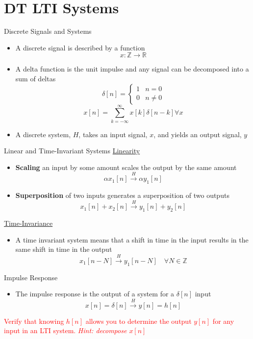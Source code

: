 \section{DT LTI Systems}

\begin{frame}{Discrete Signals and Systems}

    \begin{itemize}
        \item A discrete signal is described by a function
            \[
                x: \mathbb{Z} \rightarrow \mathbb{R}
            \]
        \item A delta function is the unit impulse and any signal can be decomposed into a sum of deltas
            \[
                \delta[n] =
                \begin{cases}
                    1 & n= 0 \\
                    0 & n\ne 0
                \end{cases}
            \]
            \[
                x[n] = \sum_{k=-\infty}^{\infty} x[k]\delta[n-k] \forall x
            \]
        \item A discrete system, $H$, takes an input signal, $x$, and yields an output signal, $y$
    \end{itemize}
\end{frame}

\begin{frame}{Linear and Time-Invariant Systems}
    \underline{Linearity}
    \begin{itemize}
        \item \textbf{Scaling} an input by some amount scales the output by the same amount
        \[\alpha x_1[n] \overset{H}{\longrightarrow} \alpha y_1[n]\]
        \item \textbf{Superposition} of two inputs generates a superposition of two outputs
        \[x_1[n] + x_2[n] \overset{H}{\longrightarrow} y_1[n] + y_2[n]\]
    \end{itemize}
    \underline{Time-Invariance}
    \begin{itemize}
        \item A time invariant system means that a shift in time in the input results in the same shift in time in the output
        \[
        x_1[n-N] \overset{H}{\longrightarrow} y_1[n-N]\quad \forall N \in \mathbb{Z}
        \]
    \end{itemize}
\end{frame}

\begin{frame}{Impulse Response}
\begin{itemize}
    \item The impulse response is the output of a system for a $\delta[n]$ input
    \[
        x[n] = \delta[n] \overset{H}{\longrightarrow} y[n] = h[n]
    \]
\end{itemize}

\vspace{30px}

\textcolor{red}{Verify that knowing $h[n]$ allows you to determine the output $y[n]$ for any input in an LTI system. \textit{Hint: decompose $x[n]$}}

\end{frame}

